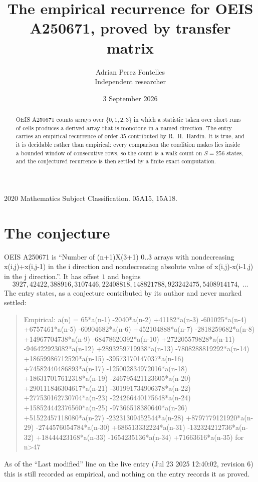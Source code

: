\documentclass[11pt,a4paper]{article}
\title{The empirical recurrence for OEIS A250671, proved by transfer matrix}
\author{Adrian Perez Fontelles\\ \small Independent researcher}
\date{3 September 2026}
\theoremstyle{plain}
\theoremstyle{definition}
\begin{document}
\maketitle

\begin{abstract}
OEIS A250671 counts arrays over $\{0,1,2,3\}$ in which a statistic taken over short runs
of cells produces a derived array that is monotone in a named direction. The entry carries an
empirical recurrence of order $35$ contributed by R.~H.~Hardin. It is true, and it is
decidable rather than empirical: every comparison the condition makes lies inside a bounded
window of consecutive rows, so the count is a walk count on $S=256$ states, and the
conjectured recurrence is then settled by a finite exact computation.
\end{abstract}

\noindent\small 2020 Mathematics Subject Classification. 05A15, 15A18.\normalsize

\section{The conjecture}

OEIS A250671 is ``Number of (n+1)X(3+1) 0..3 arrays with nondecreasing x(i,j)+x(i,j-1) in the i direction and nondecreasing absolute value of x(i,j)-x(i-1,j) in the j direction.''. It has offset $1$ and begins
\[
3927, 42422, 388916, 3107446, 22408818, 148821788, 923242475, 5408914174,\ \dots
\]
The entry states, as a conjecture contributed by its author and never marked settled:
\begin{quote}
Empirical: a(n) = 65*a(n-1) -2040*a(n-2) +41182*a(n-3) -601025*a(n-4) +6757461*a(n-5) -60904682*a(n-6) +452104888*a(n-7) -2818259682*a(n-8) +14967704738*a(n-9) -68478620392*a(n-10) +272205579828*a(n-11) -946422923082*a(n-12) +2893259719938*a(n-13) -7808288819292*a(n-14) +18659986712520*a(n-15) -39573170147037*a(n-16) +74582440486893*a(n-17) -125002834972016*a(n-18) +186317017612318*a(n-19) -246795421123605*a(n-20) +290111846304617*a(n-21) -301991734906378*a(n-22) +277530162730704*a(n-23) -224266440175648*a(n-24) +158524442376560*a(n-25) -97366518380640*a(n-26) +51522457118080*a(n-27) -23231309452544*a(n-28) +8797779121920*a(n-29) -2744576054784*a(n-30) +686513332224*a(n-31) -132324212736*a(n-32) +18444423168*a(n-33) -1654235136*a(n-34) +71663616*a(n-35) for n>47
\end{quote}
As of the ``Last modified'' line on the live entry (Jul 23 2025 12:40:02, revision 6) this is still
recorded as empirical, and nothing on the entry records it as proved.
\end{document}
